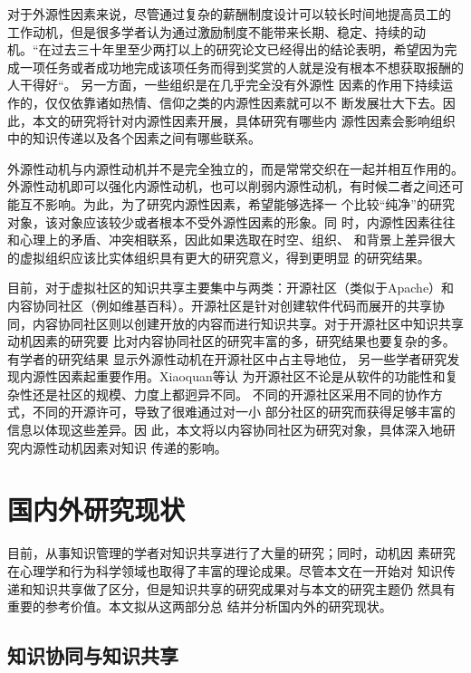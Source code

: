 \documentclass[12pt,a4paper]{ctexart}
\begin{document}
对于外源性因素来说，尽管通过复杂的薪酬制度设计可以较长时间地提高员工的
工作动机，但是很多学者认为通过激励制度不能带来长期、稳定、持续的动机。“在过去三十年里至少两打以上的研究论文已经得出的结论表明，希望因为完成一项任务或者成功地完成该项任务而得到奖赏的人就是没有根本不想获取报酬的人干得好“\cite{93120316461993}。
另一方面，一些组织是在几乎完全没有外源性
因素的作用下持续运作的，仅仅依靠诸如热情、信仰之类的内源性因素就可以不
断发展壮大下去。因此，本文的研究将针对内源性因素开展，具体研究有哪些内
源性因素会影响组织中的知识传递以及各个因素之间有哪些联系。

外源性动机与内源性动机并不是完全独立的，而是常常交织在一起并相互作用的。
外源性动机即可以强化内源性动机，也可以削弱内源性动机，有时候二者之间还可
能互不影响\cite{deci1971eem}。为此，为了研究内源性因素，希望能够选择一
个比较“纯净”的研究对象，该对象应该较少或者根本不受外源性因素的形象。同
时，内源性因素往往和心理上的矛盾、冲突相联系，因此如果选取在时空、组织、
和背景上差异很大的虚拟组织应该比实体组织具有更大的研究意义，得到更明显
的研究结果。

目前，对于虚拟社区的知识共享主要集中与两类：开源社区（类似于Apache）和
内容协同社区（例如维基百科）。开源社区是针对创建软件代码而展开的共享协
同，内容协同社区则以创建开放的内容而进行知识共享。对于开源社区中知识共享动机因素的研究要
比对内容协同社区的研究丰富的多，研究结果也要复杂的多。有学者的研究结果
显示外源性动机在开源社区中占主导地位\cite{10.1109/HICSS.2001.927045}，
另一些学者研究发现内源性因素起重要作用\cite{Lakhani2003}。Xiaoquan等认
为开源社区不论是从软件的功能性和复杂性还是社区的规模、力度上都迥异不同。
不同的开源社区采用不同的协作方式，不同的开源许可，导致了很难通过对一小
部分社区的研究而获得足够丰富的信息以体现这些差异\cite{Zhang2006}。因
此，本文将以内容协同社区为研究对象，具体深入地研究内源性动机因素对知识
传递的影响。


\section{国内外研究现状}
目前，从事知识管理的学者对知识共享进行了大量的研究；同时，动机因
素研究在心理学和行为科学领域也取得了丰富的理论成果。尽管本文在一开始对
知识传递和知识共享做了区分，但是知识共享的研究成果对与本文的研究主题仍
然具有重要的参考价值。本文拟从这两部分总
结并分析国内外的研究现状。

\subsection{知识协同与知识共享}
\end{document}
